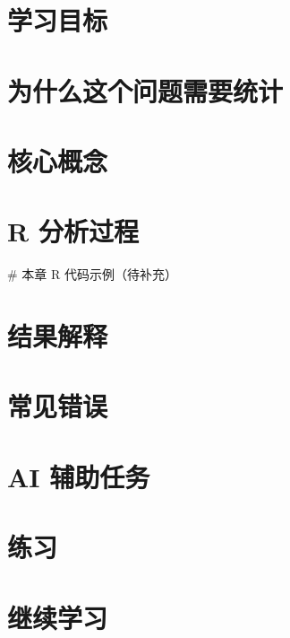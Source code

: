 \documentclass[
  letterpaper,
]{scrbook}
\newenvironment{Shaded}{\begin{snugshade}}{\end{snugshade}}
\newcommand{\CommentTok}[1]{\textcolor[rgb]{0.37,0.37,0.37}{#1}}
\begin{document}
\section{学习目标}\label{ux5b66ux4e60ux76eeux6807-10}

\section{为什么这个问题需要统计}\label{ux4e3aux4ec0ux4e48ux8fd9ux4e2aux95eeux9898ux9700ux8981ux7edfux8ba1-7}

\section{核心概念}\label{ux6838ux5fc3ux6982ux5ff5-7}

\section{R 分析过程}\label{r-ux5206ux6790ux8fc7ux7a0b-9}

\begin{Shaded}
\begin{Highlighting}[]
\CommentTok{\# 本章 R 代码示例（待补充）}
\end{Highlighting}
\end{Shaded}

\section{结果解释}\label{ux7ed3ux679cux89e3ux91ca-7}

\section{常见错误}\label{ux5e38ux89c1ux9519ux8bef-15}

\section{AI 辅助任务}\label{ai-ux8f85ux52a9ux4efbux52a1-8}

\section{练习}\label{ux7ec3ux4e60-17}

\section{继续学习}\label{ux7ee7ux7eedux5b66ux4e60-8}
\end{document}
